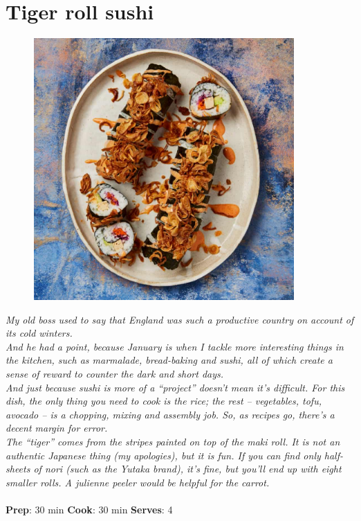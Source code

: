 \documentclass{book}
\begin{document}
\section{Tiger roll sushi}
\begin{figure}
\centering\includegraphics[width=10cm,height=10cm,keepaspectratio]{Recipe_Pictures/Tiger_roll_sushi.png}
\end{figure}
\emph{My old boss used to say that England was such a productive country on account of its cold winters. \\ 
And he had a point, because January is when I tackle more interesting things in the kitchen, such as marmalade, bread-baking and sushi, all of which create a sense of reward to counter the dark and short days.\\ 
And just because sushi is more of a “project” doesn’t mean it’s difficult. For this dish, the only thing you need to cook is the rice; the rest – vegetables, tofu, avocado – is a chopping, mixing and assembly job. So, as recipes go, there’s a decent margin for error.\\ 
The “tiger” comes from the stripes painted on top of the maki roll. It is not an authentic Japanese thing (my apologies), but it is fun. If you can find only half-sheets of nori (such as the Yutaka brand), it’s fine, but you’ll end up with eight smaller rolls. A julienne peeler would be helpful for the carrot.}\\\\ 
\textbf{Prep}: 30 min
\textbf{Cook}: 30 min
\textbf{Serves}: 4
\end{document}

